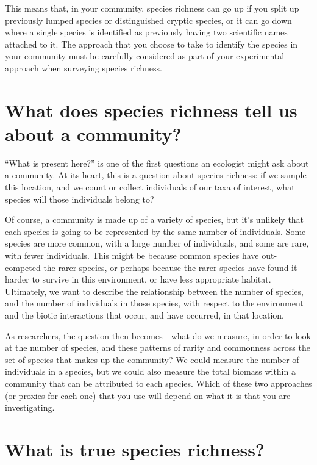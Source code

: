 \documentclass[
  letterpaper,
  DIV=11,
  numbers=noendperiod]{scrreprt}
\begin{document}
This means that, in your community, species richness can go up if you
split up previously lumped species or distinguished cryptic species, or
it can go down where a single species is identified as previously having
two scientific names attached to it. The approach that you choose to
take to identify the species in your community must be carefully
considered as part of your experimental approach when surveying species
richness.

\section{What does species richness tell us about a
community?}\label{what-does-species-richness-tell-us-about-a-community}

``What is present here?'' is one of the first questions an ecologist
might ask about a community. At its heart, this is a question about
species richness: if we sample this location, and we count or collect
individuals of our taxa of interest, what species will those individuals
belong to?

Of course, a community is made up of a variety of species, but it's
unlikely that each species is going to be represented by the same number
of individuals. Some species are more common, with a large number of
individuals, and some are rare, with fewer individuals. This might be
because common species have out-competed the rarer species, or perhaps
because the rarer species have found it harder to survive in this
environment, or have less appropriate habitat. Ultimately, we want to
describe the relationship between the number of species, and the number
of individuals in those species, with respect to the environment and the
biotic interactions that occur, and have occurred, in that location.

As researchers, the question then becomes - what do we measure, in order
to look at the number of species, and these patterns of rarity and
commonness across the set of species that makes up the community? We
could measure the number of individuals in a species, but we could also
measure the total biomass within a community that can be attributed to
each species. Which of these two approaches (or proxies for each one)
that you use will depend on what it is that you are investigating.

\section{What is true species
richness?}\label{what-is-true-species-richness}
\end{document}

